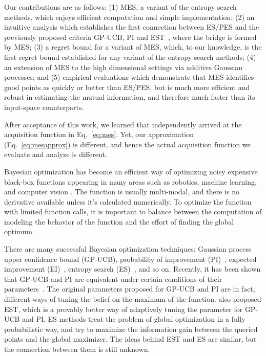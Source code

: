 Our contributions are as follows: (1) MES, a variant of the entropy search methods, which enjoys efficient computation and simple implementation; (2) an intuitive analysis which establishes the first connection between ES/PES and the previously proposed criteria GP-UCB, PI and EST~\cite{wang2016est}, where the bridge is formed by MES; (3) a regret bound for a variant of MES, which, to our knowledge, is the first regret bound established for any variant of the entropy search methods; (4) an extension of MES to the high dimensional settings via additive Gaussian processes; and (5) %
empirical evaluations which demonstrate that MES identifies good points as quickly or better than ES/PES, but is much more efficient and robust in estimating the mutual information, and therefore much faster than its input-space counterparts.

After acceptance of this work, we learned that \citet{hoffmanoutput} independently arrived at the acquisition function in Eq.~\eqref{eq:mes}. Yet, our approximation (Eq.~\eqref{eq:mesapprox}) is different, and hence the actual acquisition function we evaluate and analyze is different.

%


\iffalse
Bayesian optimization has become an efficient way of optimizing noisy expensive black-box functions appearing in many areas such as robotics,  machine learning, and computer vision \citep{brochu2009,calandra2014experimental,krause2011contextual,lizotte2007,snoek2012practical,thornton13,wang17icra}. The function is usually multi-modal, and there is no derivative available unless it's calculated numerically. To optimize the function with limited function calls, it is important to balance between the computation of modeling the behavior of the function and the effort of finding the global optimum. 

There are many successful Bayesian optimization techniques: Gaussian process upper confidence bound (GP-UCB), probability of improvement (PI)~\cite{kushner1964}, expected improvement (EI)~\cite{mockus1974}, entropy search (ES)~\cite{hennig2012,hernandez2014predictive}, and so on. Recently, it has been shown that GP-UCB and PI are equivalent under certain conditions of their parameters~\cite{wang2016est}. The original parameters proposed for GP-UCB and PI are in fact, different ways of tuning the belief on the maximum of the function. \cite{wang2016est} also proposed EST, which is a provably better way of adaptively tuning the parameter for GP-UCB and PI. ES methods treat the problem of global optimization in a fully probabilistic way, and try to maximize the information gain between the queried points and the global maximizer. The ideas behind EST and ES are similar, but the connection between them is still unknown.

